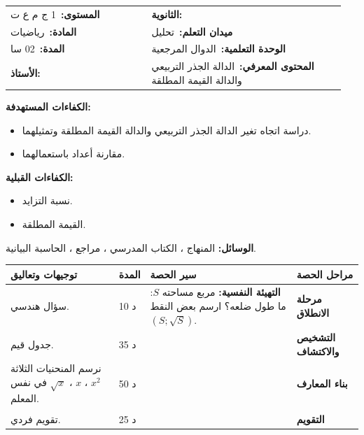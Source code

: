 \documentclass[12pt,a4paper]{article}
\makeatletter
\newenvironment{LTR}{\begin{otherlanguage}{english}}{\end{otherlanguage}}
\newcommand{\ar}[1]{\foreignlanguage{arabic}{#1}}
\newcommand{\R}{\mathbb{R}}
\newcommand{\Phase}[1]{\textbf{#1}}
\newcommand{\Fld}[2]{\textbf{#1:}\ #2}
\newcommand{\ModhHead}[9]{%
\begin{LTR}
\begin{tcolorbox}[enhanced,colback=white,colframe=cThm!85!black,arc=4mm,boxrule=1pt,top=14pt,bottom=6pt,left=8pt,right=8pt,
 overlay={\node[fill=cThm!85!black,text=white,rounded corners=3mm,inner xsep=14pt,inner ysep=4pt,font=\large\bfseries] at ([yshift=0pt]frame.north){\ar{مذكرة رقم #1}};},
 before upper={\selectlanguage{arabic}}]
\begin{tabular}{@{}p{0.4\linewidth}p{0.55\linewidth}@{}}
\Fld{المستوى}{#2} & \Fld{الثانوية}{\dotfill}\\[3pt]
\Fld{المادة}{رياضيات} & \Fld{ميدان التعلم}{#3}\\[3pt]
\Fld{المدة}{#5} & \Fld{الوحدة التعلمية}{#4}\\[3pt]
\Fld{الأستاذ}{\dotfill} & \Fld{المحتوى المعرفي}{#6}\\
\end{tabular}
\end{tcolorbox}
\begin{tcolorbox}[enhanced,colback=white,colframe=cThm!85!black,arc=3mm,boxrule=0.8pt,sidebyside,sidebyside align=top,lefthand ratio=0.5,
 segmentation style={dashed,cThm!60},before upper={\selectlanguage{arabic}},before lower={\selectlanguage{arabic}}]
\textbf{الكفاءات المستهدفة:}\par #8
\tcblower
\textbf{الكفاءات القبلية:}\par #7
\end{tcolorbox}
\end{LTR}
\par\smallskip\textbf{الوسائل:} #9\par\smallskip}
\newenvironment{Sayr}{%
\begin{LTR}\renewcommand{\arraystretch}{1.25}
\begin{longtable}{|p{0.17\textwidth}|>{\centering\arraybackslash}p{0.06\textwidth}|p{0.53\textwidth}|>{\centering\arraybackslash}p{0.12\textwidth}|}
\hline\rowcolor{cThm!12}\ar{\textbf{توجيهات وتعاليق}} & \ar{\textbf{المدة}} & \ar{\textbf{سير الحصة}} & \ar{\textbf{مراحل الحصة}}\\\hline\endhead
\hline\endfoot}{\end{longtable}\end{LTR}}
\newcommand{\Row}[4]{\ar{\small #4} & \ar{#3} & \ar{#2} & \cellcolor{cThm!8}\ar{\Phase{#1}}\\\hline}
\newcommand{\Lab}[2]{\foreignlanguage{english}{\tcbox[on line,colback=#1,colframe=#1,boxrule=0pt,arc=2pt,boxsep=1pt,left=5pt,right=5pt,top=1pt,bottom=1pt]{\ar{\textcolor{white}{\textbf{#2}}}}}}
\newcommand{\Num}[1]{\foreignlanguage{english}{\tikz[baseline=(c.base)]\node[fill=cDef,text=white,inner sep=2pt,font=\footnotesize\bfseries](c){#1};}}
\newcommand{\ck}{\ensuremath{{\color{cRem}\checkmark}}}
\makeatother
\begin{document}
\newpage
\ModhHead{26}{1 ج م ع ت}{تحليل}{الدوال المرجعية}{02 سا}{الدالة الجذر التربيعي والدالة القيمة المطلقة}%
{\begin{itemize}\item نسبة التزايد.\item القيمة المطلقة.\end{itemize}}%
{\begin{itemize}\item دراسة اتجاه تغير الدالة الجذر التربيعي والدالة القيمة المطلقة وتمثيلهما.\item مقارنة أعداد باستعمالهما.\end{itemize}}%
{المنهاج ، الكتاب المدرسي ، مراجع ، الحاسبة البيانية.}
\begin{Sayr}
\Row{مرحلة الانطلاق}{%
\textbf{التهيئة النفسية:} مربع مساحته $S$: ما طول ضلعه؟ ارسم بعض النقط $(S;\sqrt S)$.}{10 د}{سؤال هندسي.}
\Row{التشخيص والاكتشاف}{%
\Lab{cEx}{وضعية مقترحة}\par\ck\ طول الضلع $\sqrt S$ حيث $S\geqslant0$: $\sqrt0=0$ ، $\sqrt1=1$ ، $\sqrt4=2$ ، $\sqrt9=3$.\par
\ck\ كلما كبرت المساحة كبر الضلع ، لكن بشكل أبطأ.\par
}{35 د}{جدول قيم.}
\Row{بناء المعارف}{%
\Lab{cThm}{الجذر التربيعي}\ $x\mapsto\sqrt x$ معرفة على $[0;+\infty[$ ، و $\dfrac{f(b)-f(a)}{b-a}=\dfrac1{\sqrt a+\sqrt b}>0$: متزايدة تماماً على $[0;+\infty[$. منحناها نصف قطع مكافئ.\par\Lab{cThm}{القيمة المطلقة}\ $x\mapsto|x|$ معرفة على $\R$: $|x|=-x$ على $]-\infty;0]$ (متناقصة) و $|x|=x$ على $[0;+\infty[$ (متزايدة). زوجية ، ومنحناها نصفا مستقيمين.\par}{50 د}{نرسم المنحنيات الثلاثة $x^2$ ، $x$ ، $\sqrt x$ في نفس المعلم.}
\Row{}{%
\Lab{cEx}{مثال}\par\ck\ $2{,}5<2{,}6$ ، إذن $\sqrt{2{,}5}<\sqrt{2{,}6}$.\par
\ck\ من أجل $0\leqslant x\leqslant1$: $x^2\leqslant x\leqslant\sqrt x$ (نقارن المنحنيات الثلاثة).\par
\Lab{cThm!80!black}{حذار}\ $\sqrt{x^2}=|x|$ وليس $x$.}{}{}
\Row{التقويم}{%
\Lab{cEx}{تطبيق}\par\Num{1} إذا كان $1\leqslant x\leqslant9$ فما حصر $\sqrt x$ ؟ \Num{2} ارسم منحنى $g(x)=|x-2|$ انطلاقاً من منحنى $|x|$.\par\textbf{الحل:} \Num{1} $1\leqslant\sqrt x\leqslant3$ ؛ \Num{2} انسحاب شعاعه $2\vec i$.\par\textbf{واجب منزلي:} تمارين من الكتاب المدرسي.\par\smallskip\textbf{ملاحظات حول سير الحصة:} \dotfill}{25 د}{تقويم فردي.}
\end{Sayr}
\end{document}
